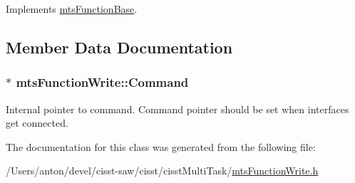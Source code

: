 Implements \hyperlink{classmts_function_base_ae6e5497be34d5563f2df3cb24d68e959}{mts\+Function\+Base}.



\subsection{Member Data Documentation}
\hypertarget{classmts_function_write_ac457eca9ee4e0f8bfc4b2c8a9b3a7927}{}
\subsubsection[{Command}]{$\ast$ mts\+Function\+Write\+::\+Command\hspace{0.3cm}{\ttfamily [protected]}}\label{classmts_function_write_ac457eca9ee4e0f8bfc4b2c8a9b3a7927}
Internal pointer to command. Command pointer should be set when interfaces get connected. 

The documentation for this class was generated from the following file\+:\begin{DoxyCompactItemize}
\item 
/\+Users/anton/devel/cisst-\/saw/cisst/cisst\+Multi\+Task/\hyperlink{mts_function_write_8h}{mts\+Function\+Write.\+h}\end{DoxyCompactItemize}
